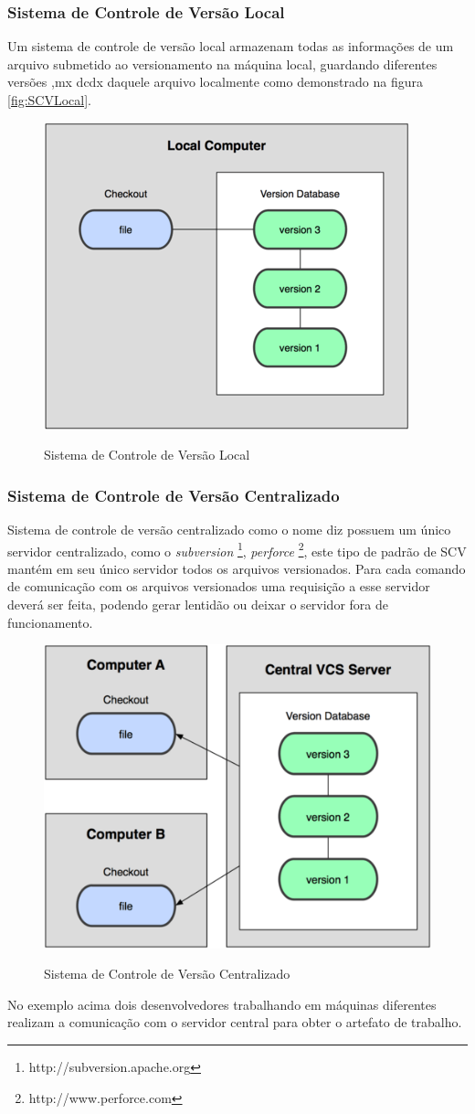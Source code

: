 \subsubsection{Sistema de Controle de Versão Local}
Um sistema de controle de versão local	armazenam todas as informações de um arquivo submetido ao versionamento na máquina local, guardando diferentes versões    ,mx dcdx daquele arquivo localmente como demonstrado na figura \autoref{fig:SCVLocal}.
\begin{figure}[tbh]
\centering
\caption[Sistema de Controle de Versão Local]{Sistema de Controle de Versão Local}
\includegraphics[width=0.4\linewidth]{./images/scvlocal}
\label{fig:SCVLocal}
\end{figure}
\subsubsection{Sistema de Controle de Versão Centralizado} Sistema de controle de versão centralizado como o nome diz possuem um único servidor centralizado, como o \textit{subversion} \footnote{http://subversion.apache.org}, \textit{perforce} \footnote{http://www.perforce.com}, este tipo de padrão de SCV mantém em seu único servidor todos os arquivos versionados. Para cada comando de comunicação com os arquivos versionados uma requisição a esse servidor deverá ser feita, podendo gerar lentidão ou deixar o servidor fora de funcionamento.
\begin{figure}[tbh]
\centering
\caption[Sistema de Controle de Versão Centralizado]{Sistema de Controle de Versão Centralizado}
\includegraphics[width=0.4\linewidth]{./images/scvcentral}
\label{fig:SCVCentral}
\end{figure}
No exemplo acima dois desenvolvedores trabalhando em máquinas diferentes realizam a comunicação com o servidor central para obter o artefato de trabalho.	
